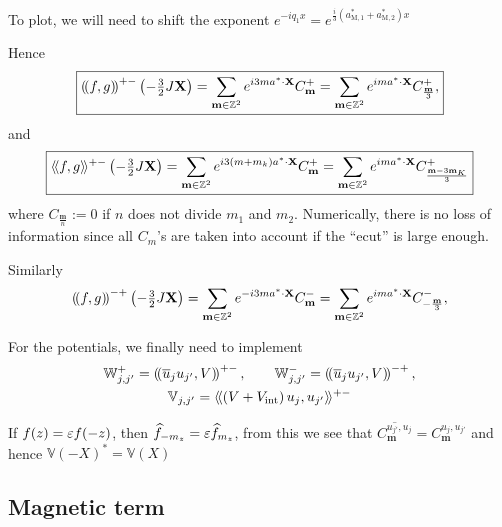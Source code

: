 \documentclass[11pt,a4paper,reqno,french,tikz]{amsart}
\newcommand{\pa}[1]{\left( #1 \right)} %
\newcommand{\f}[2]{\frac{#1}{#2}} %
\newcommand{\ind}[1]{_{\textup{#1}}} %
\newcommand{\bbV}{\mathbb{V}}
\newcommand{\db}[1]{\left(\!\left( #1 \right)\!\right)}
\def\bX{{\mathbf X}}
\def\bmm{{\mathbf m}}
\def\bbV{{\mathbb V}}
\def\bbW{{\mathbb W}}
\def\lAngle{\langle\!\langle}
\def\rAngle{\rangle\!\rangle}
\begin{document}
To plot, we will need to shift the exponent $e^{-iq_1 x} = e^{\f{i}{3}\pa{a_{\text{M},1}^*+a_{\text{M},2}^*}x}$

{\color{red}{TO RECTIFY}}

Hence
\begin{align*}
\boxed{\db{f,g}^{+-}\pa{-\tfrac{3}{2} J \bX} =  \sum_{\bmm \in \Z^2} e^{i 3 ma^* \cdot \bX} C^+_\bmm=  \sum_{\bmm \in \Z^2} e^{i m a^* \cdot \bX} C^+_{\f{\bmm}{3}},}
\end{align*}
and
\begin{align*}
\boxed{\lAngle f,g \rAngle^{+-}\pa{-\tfrac{3}{2} J\bX} =  \sum_{\bmm \in \Z^2} e^{i 3 \pa{m+m_k}a^* \cdot \bX} C^+_\bmm =  \sum_{\bmm \in \Z^2} e^{i m a^* \cdot \bX} C^+_{\f{\bmm-3\bmm_K}{3}}}
\end{align*}
where $C_{\f{\bmm}{n}} := 0$ if $n$ does not divide $m_1$ and $m_2$. Numerically, there is no loss of information since all $C_m$'s are taken into account if the ``ecut'' is large enough.

Similarly
\begin{align*}
\db{f,g}^{-+}\pa{-\tfrac{3}{2} J \bX} =  \sum_{\bmm \in \Z^2} e^{-i 3 ma^* \cdot \bX} C^-_\bmm=  \sum_{\bmm \in \Z^2} e^{i m a^* \cdot \bX} C^-_{-\f{\bmm}{3}},
\end{align*}

For the potentials, we finally need to implement
\begin{multline*}
\bbW_{j,j'}^+ = \db{\overline{u}_j u_{j'}, V}^{+-}, \qquad \bbW_{j,j'}^- = \db{\overline{u}_j u_{j'}, V}^{-+},\\
\bbV_{j,j'} = \lAngle \pa{V+V\ind{int}} u_j , u_{j'} \rAngle^{+-}
\end{multline*}


If $f(z) = \varepsilon f(-z)$, then $\widehat{f}_{-m_z} = \varepsilon \widehat{f}_{m_z}$, from this we see that $\overline{C_\bmm^{u_{j'},u_{j}}} = C_\bmm^{u_{j},u_{j'}}$ and hence $\bbV(-X)^* = \bbV(X)$

\subsection{Magnetic term}%
\end{document}
